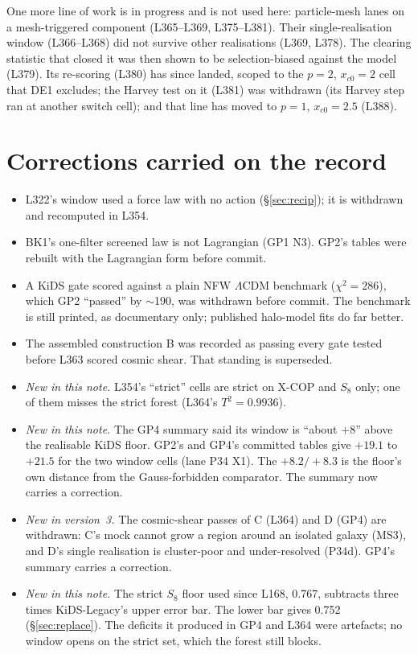 \documentclass[10pt]{article}
\begin{document}
One more line of work is in progress and is not used here: particle-mesh lanes on a mesh-triggered component (L365--L369, L375--L381). Their single-realisation window (L366--L368) did not survive other realisations (L369, L378). The clearing statistic that closed it was then shown to be selection-biased against the model (L379). Its re-scoring (L380) has since landed, scoped to the $p=2$, $x_{c0}=2$ cell that DE1 excludes; the Harvey test on it (L381) was withdrawn (its Harvey step ran at another switch cell); and that line has moved to $p=1$, $x_{c0}=2.5$ (L388).

\section{Corrections carried on the record}
\begin{itemize}
\item L322's window used a force law with no action (\S\ref{sec:recip}); it is withdrawn and recomputed in L354.
\item BK1's one-filter screened law is not Lagrangian (GP1 N3). GP2's tables were rebuilt with the Lagrangian form before commit.
\item A KiDS gate scored against a plain NFW $\Lambda$CDM benchmark ($\chi^2=286$), which GP2 ``passed'' by $\sim$190, was withdrawn before commit. The benchmark is still printed, as documentary only; published halo-model fits do far better.
\item The assembled construction B was recorded as passing every gate tested before L363 scored cosmic shear. That standing is superseded.
\item \emph{New in this note.} L354's ``strict'' cells are strict on X-COP and $S_8$ only; one of them misses the strict forest (L364's $T^2=0.9936$).
\item \emph{New in this note.} The GP4 summary said its window is ``about $+8$'' above the realisable KiDS floor. GP2's and GP4's committed tables give $+19.1$ to $+21.5$ for the two window cells (lane P34 X1). The $+8.2/+8.3$ is the floor's own distance from the Gauss-forbidden comparator. The summary now carries a correction.
\item \emph{New in version~3.} The cosmic-shear passes of C (L364) and D (GP4) are withdrawn: C's mock cannot grow a region around an isolated galaxy (MS3), and D's single realisation is cluster-poor and under-resolved (P34d). GP4's summary carries a correction.
\item \emph{New in this note.} The strict $S_8$ floor used since L168, 0.767, subtracts three times KiDS-Legacy's upper error bar. The lower bar gives 0.752 (\S\ref{sec:replace}). The deficits it produced in GP4 and L364 were artefacts; no window opens on the strict set, which the forest still blocks.
\end{itemize}
\end{document}
